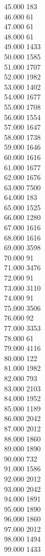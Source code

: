 { 45.000	183 \\
 46.000	61 \\
 47.000	61 \\
 48.000	61 \\
 49.000	1433 \\
 50.000	1585 \\
 51.000	1707 \\
 52.000	1982 \\
 53.000	1402 \\
 54.000	1677 \\
 55.000	1708 \\
 56.000	1554 \\
 57.000	1647 \\
 58.000	1738 \\
 59.000	1646 \\
 60.000	1616 \\
 61.000	1677 \\
 62.000	1676 \\
 63.000	7500 \\
 64.000	183 \\
 65.000	1525 \\
 66.000	1280 \\
 67.000	1616 \\
 68.000	1616 \\
 69.000	3598 \\
 70.000	91 \\
 71.000	3476 \\
 72.000	91 \\
 73.000	3110 \\
 74.000	91 \\
 75.000	3506 \\
 76.000	92 \\
 77.000	3353 \\
 78.000	61 \\
 79.000	4116 \\
 80.000	122 \\
 81.000	1982 \\
 82.000	793 \\
 83.000	2103 \\
 84.000	1952 \\
 85.000	1189 \\
 86.000	2042 \\
 87.000	2012 \\
 88.000	1860 \\
 89.000	1890 \\
 90.000	732 \\
 91.000	1586 \\
 92.000	2012 \\
 93.000	2042 \\
 94.000	1891 \\
 95.000	1890 \\
 96.000	1860 \\
 97.000	2012 \\
 98.000	1494 \\
 99.000	1433 \\
}
